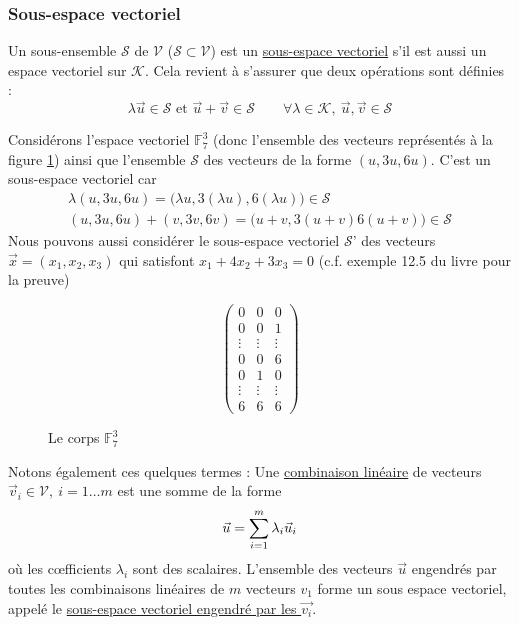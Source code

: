 \documentclass[11pt,a4paper]{article}
\newcommand{\m}[1]{\ensuremath{\mathcal{#1}}}
\newcommand{\F}{\ensuremath{\mathbb{F}}}
\begin{document}
\subsubsection{Sous-espace vectoriel}
Un sous-ensemble \m{S} de \m{V} ($\m{S} \subset \m{V}$) est un \uline{sous-espace vectoriel} s'il est aussi un espace vectoriel sur \m{K}. Cela revient à s'assurer que deux opérations sont définies :
\begin{equation*}
	\lambda\vec{u} \in \m{S} \text{ et } \vec{u} + \vec{v} \in \m{S} \qquad \forall \lambda \in \m{K},\ \vec{u},\vec{v} \in \m{S}
\end{equation*}
\begin{exemple}

	Considérons l'espace vectoriel $\F_7^3$ (donc l'ensemble des vecteurs représentés à la figure \ref{corps f37}) ainsi que l'ensemble \m{S} des vecteurs de la forme $(u,3u,6u)$. C'est un sous-espace vectoriel car 
	\begin{align*}
		\lambda(u,3u,6u) = \big(\lambda u,3(\lambda u),6(\lambda u)\big) \in \m{S}\\
		(u,3u,6u)+(v,3v,6v) = \big(u+v, 3(u+v) 6(u+v)\big)\in \m{S}
	\end{align*}
	Nous pouvons aussi considérer le sous-espace vectoriel \m{S}' des vecteurs $\vec{x} = (x_1,x_2,x_3)$ qui satisfont $x_1 + 4x_2 + 3x_3 = 0$ (c.f. exemple 12.5 du livre pour la preuve)
\end{exemple}
\begin{figure}
	\[\begin{pmatrix}
		0 & 0 & 0\\
		0 & 0 & 1\\
		\vdots & \vdots & \vdots\\
		0 & 0 & 6\\
		0 & 1 & 0\\
		\vdots & \vdots & \vdots\\
		6 & 6 & 6
	\end{pmatrix}\]
	\caption{Le corps $\F_7^3$}
	\label{corps f37}
\end{figure}
Notons également ces quelques termes : Une \uline{combinaison linéaire} de vecteurs $\vec{v}_i \in \m{V},\ i= 1\ldots m$ est une somme de la forme 
\begin{equation*}
	\vec{u} = \somme{m}{i=1} \lambda_i\vec{u}_i
\end{equation*}
où les c\oe fficients $\lambda_i$ sont des scalaires. L'ensemble des vecteurs $\vec{u}$ engendrés par toutes les combinaisons linéaires de $m$ vecteurs $v_1$ forme un sous espace vectoriel, appelé le \uline{sous-espace vectoriel engendré par les $\vec{v_i}$}.
\end{document}
